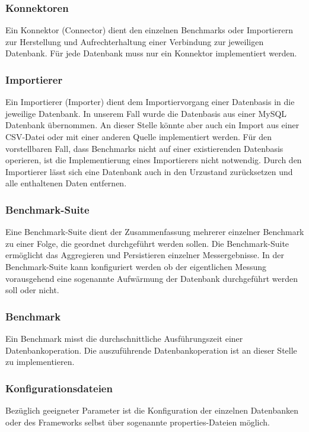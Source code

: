 \documentclass[11pt, a4paper, oneside]{article} %
\begin{document}
\subsubsection{Konnektoren}
Ein Konnektor (Connector) dient den einzelnen Benchmarks oder Importierern zur Herstellung und Aufrechterhaltung einer Verbindung zur jeweiligen Datenbank. Für jede Datenbank muss nur ein Konnektor implementiert werden.

\subsubsection{Importierer}
Ein Importierer (Importer) dient dem Importiervorgang einer Datenbasis in die jeweilige Datenbank. In unserem Fall wurde die Datenbasis aus einer MySQL Datenbank übernommen. An dieser Stelle könnte aber auch ein Import aus einer CSV-Datei oder mit einer anderen Quelle implementiert werden. Für den vorstellbaren Fall, dass Benchmarks nicht auf einer existierenden Datenbasis operieren, ist die Implementierung eines Importierers nicht notwendig. Durch den Importierer lässt sich eine Datenbank auch in den Urzustand zurücksetzen und alle enthaltenen Daten entfernen.

\subsubsection{Benchmark-Suite}
Eine Benchmark-Suite dient der Zusammenfassung mehrerer einzelner Benchmark zu einer Folge, die geordnet durchgeführt werden sollen. Die Benchmark-Suite ermöglicht das Aggregieren und Persistieren einzelner Messergebnisse. In der Benchmark-Suite kann konfiguriert werden ob der eigentlichen Messung vorausgehend eine sogenannte Aufwärmung der Datenbank durchgeführt werden soll oder nicht.

\subsubsection{Benchmark}
Ein Benchmark misst die durchschnittliche Ausführungszeit einer Datenbankoperation. Die auszuführende Datenbankoperation ist an dieser Stelle zu implementieren.

\subsubsection{Konfigurationsdateien}
Bezüglich geeigneter Parameter ist die Konfiguration der einzelnen Datenbanken oder des Frameworks selbst über sogenannte properties-Dateien möglich.
\end{document}
